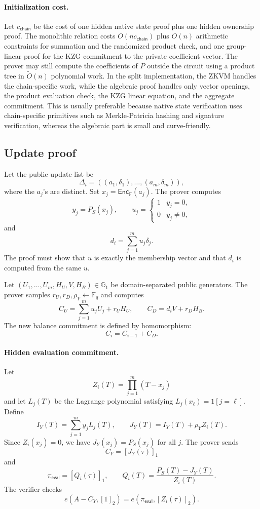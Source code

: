 \documentclass[runningheads]{llncs}
\newcommand{\F}{\mathbb{F}}
\newcommand{\G}{\mathbb{G}}
\newcommand{\Enc}{\mathsf{Enc}}
\newcommand{\softO}{\widetilde{O}}
\newcommand{\dlist}{\Delta}
\begin{document}
\paragraph{Initialization cost.}
Let \(c_{\mathsf{chain}}\) be the cost of one hidden native state proof plus one hidden ownership proof.  The monolithic relation costs \(O(nc_{\mathsf{chain}})\) plus \(O(n)\) arithmetic constraints for summation and the randomized product check, and one group-linear proof for the KZG commitment to the private coefficient vector.  The prover may still compute the coefficients of \(P\) outside the circuit using a product tree in \(\softO(n)\) polynomial work.  In the split implementation, the ZKVM handles the chain-specific work, while the algebraic proof handles only vector openings, the product evaluation check, the KZG linear equation, and the aggregate commitment.  This is usually preferable because native state verification uses chain-specific primitives such as Merkle-Patricia hashing and signature verification, whereas the algebraic part is small and curve-friendly.

\subsection{Update proof}

Let the public update list be
\[
        \dlist_i=((a_1,\delta_1),\ldots,(a_m,\delta_m)),
\]
where the \(a_j\)'s are distinct.  Set \(x_j=\Enc_{\F}(a_j)\).  The prover computes
\[
        y_j=P_S(x_j),\qquad u_j=\begin{cases}1 & y_j=0,\\ 0 & y_j\ne 0,\end{cases}
\]
and
\[
        d_i=\sum_{j=1}^m u_j\delta_j.
\]
The proof must show that \(u\) is exactly the membership vector and that \(d_i\) is computed from the same \(u\).

Let \((U_1,\ldots,U_m,H_U,V,H_B)\in\G_1\) be domain-separated public generators.  The prover samples \(r_U,r_D,\rho_Y\leftarrow\F_q\) and computes
\[
        C_U=\sum_{j=1}^m u_jU_j+r_UH_U,
        \qquad
        C_D=d_iV+r_DH_B.
\]
The new balance commitment is defined by homomorphism:
\[
        C_i=C_{i-1}+C_D.
\]

\paragraph{Hidden evaluation commitment.}
Let
\[
        Z_i(T)=\prod_{j=1}^m (T-x_j)
\]
and let \(L_j(T)\) be the Lagrange polynomial satisfying \(L_j(x_\ell)=1[j=\ell]\).  Define
\[
        I_Y(T)=\sum_{j=1}^m y_jL_j(T),
        \qquad
        J_Y(T)=I_Y(T)+\rho_Y Z_i(T).
\]
Since \(Z_i(x_j)=0\), we have \(J_Y(x_j)=P_S(x_j)\) for all \(j\).  The prover sends
\[
        C_Y=[J_Y(\tau)]_1
\]
and
\[
        \pi_{\mathsf{eval}}=[Q_i(\tau)]_1,
        \qquad
        Q_i(T)=\frac{P_S(T)-J_Y(T)}{Z_i(T)}.
\]
The verifier checks
\[
        e(A-C_Y,[1]_2)=e(\pi_{\mathsf{eval}},[Z_i(\tau)]_2).
\]
\end{document}
